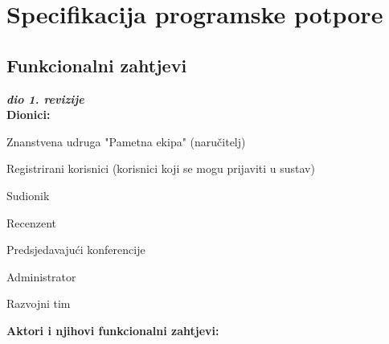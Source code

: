 \chapter{Specifikacija programske potpore}
		
	\section{Funkcionalni zahtjevi}
			
			\textbf{\textit{dio 1. revizije}}\\
			
			
			\noindent \textbf{Dionici:}
			
			\begin{packed_enum}
				
				\item Znanstvena udruga "Pametna ekipa" (naručitelj)
				\item Registrirani korisnici (korisnici koji se mogu prijaviti u sustav)
				\begin{packed_enum}
					\item Sudionik
					\item Recenzent
					\item Predsjedavajući konferencije				
					\item Administrator
				\end{packed_enum}
				\item Razvojni tim
				
			\end{packed_enum}
			
			\noindent \textbf{Aktori i njihovi funkcionalni zahtjevi:}
			
